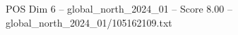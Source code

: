 \begin{textsample}{POS Dim 6 – global\_north\_2024\_01 – Score 8.00 – global\_north\_2024\_01/105162109.txt}
\end{textsample}
